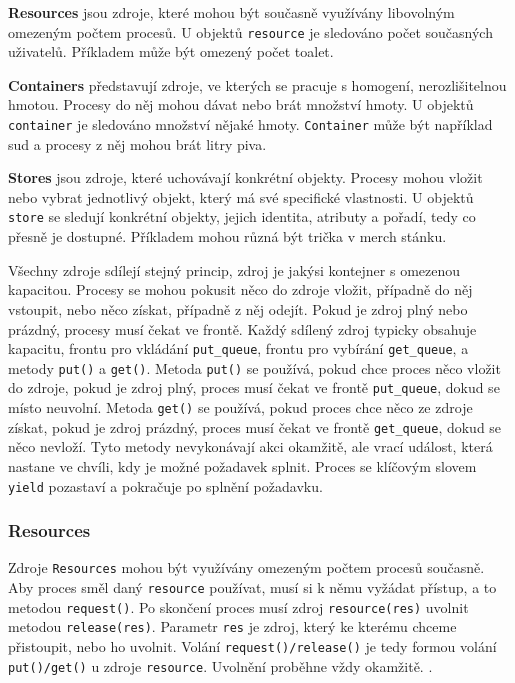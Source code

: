 \documentclass[12pt,a4paper]{article}
\begin{document}
\noindent \textbf{Resources} jsou zdroje, které mohou být současně využívány libovolným omezeným počtem procesů. U objektů \texttt{resource} je sledováno počet současných uživatelů. Příkladem může být omezený počet toalet.

\noindent \textbf{Containers} představují zdroje, ve kterých se pracuje s homogení, nerozlišitelnou hmotou. Procesy do něj mohou dávat nebo brát množství hmoty. U objektů \texttt{container} je sledováno množství nějaké hmoty. \texttt{Container} může být například sud a procesy z něj mohou brát litry piva. 

\noindent \textbf{Stores} jsou zdroje, které uchovávají konkrétní objekty. Procesy mohou vložit nebo vybrat jednotlivý objekt, který má své specifické vlastnosti. U objektů \texttt{store} se sledují konkrétní objekty, jejich identita, atributy a pořadí, tedy co přesně je dostupné. Příkladem mohou různá být trička v merch stánku.

Všechny zdroje sdílejí stejný princip, zdroj je jakýsi kontejner s omezenou kapacitou. Procesy se mohou pokusit něco do zdroje vložit, případně do něj vstoupit, nebo něco získat, případně z něj odejít. Pokud je zdroj plný nebo prázdný, procesy musí čekat ve frontě. Každý sdílený zdroj typicky obsahuje kapacitu, frontu pro vkládání \texttt{put\_queue}, frontu pro vybírání \texttt{get\_queue}, a metody \texttt{put()} a \texttt{get()}. Metoda \texttt{put()} se používá, pokud chce proces něco vložit do zdroje, pokud je zdroj plný, proces musí čekat ve frontě \texttt{put\_queue}, dokud se místo neuvolní. Metoda \texttt{get()} se používá, pokud proces chce něco ze zdroje získat, pokud je zdroj prázdný, proces musí čekat ve frontě \texttt{get\_queue}, dokud se něco nevloží. Tyto metody nevykonávají akci okamžitě, ale vrací událost, která nastane ve chvíli, kdy je možné požadavek splnit. Proces se klíčovým slovem \texttt{yield} pozastaví a pokračuje po splnění požadavku.

\subsubsection{Resources}
Zdroje \texttt{Resources} mohou být využívány omezeným počtem procesů současně. Aby proces směl daný \texttt{resource} používat, musí si k němu vyžádat přístup, a to metodou \texttt{request()}. Po skončení proces musí zdroj \texttt{resource(res)} uvolnit metodou \texttt{release(res)}. Parametr \texttt{res} je zdroj, který ke kterému chceme přistoupit, nebo ho uvolnit. Volání \texttt{request()/release()} je tedy formou volání \texttt{put()/get()} u zdroje \texttt{resource}. Uvolnění proběhne vždy okamžitě. .
\end{document}
